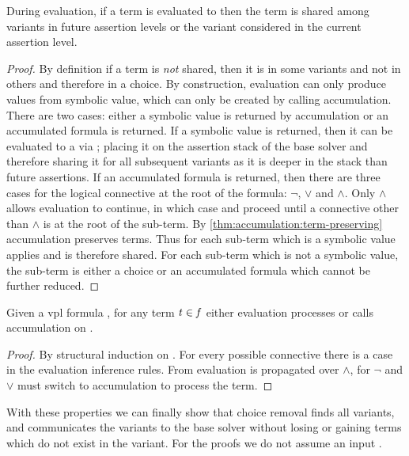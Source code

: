 \begin{theorem}
  \label{thm:evaluation:term-preserving}
  During evaluation, if a term is evaluated to \unit{} then the term is shared
  among variants in future assertion levels or the variant considered in the
  current assertion level.
\end{theorem}
%
\begin{proof}
  By definition if a term is \emph{not} shared, then it is in some variants and
  not in others and therefore in a choice. By construction, evaluation can only
  produce \unit{} values from symbolic value, which can only be created by
  calling accumulation. There are two cases: either a symbolic value is returned
  by accumulation or an accumulated formula is returned. If a symbolic value is
  returned, then it can be evaluated to a \unit{} via \evSym{}; placing it on
  the assertion stack of the base solver and therefore sharing it for all
  subsequent variants as it is deeper in the stack than future assertions. If an
  accumulated formula is returned, then there are three cases for the logical
  connective at the root of the formula: $\neg$, $\vee$ and $\wedge$. Only
  $\wedge$ allows evaluation to continue, in which case \evSym{} and \evAnd{}
  proceed until a connective other than $\wedge$ is at the root of the sub-term.
  By \autoref{thm:accumulation:term-preserving} accumulation preserves terms.
  Thus for each sub-term which is a symbolic value \evSym{} applies and is
  therefore shared. For each sub-term which is not a symbolic value, the
  sub-term is either a choice or an accumulated formula which cannot be further
  reduced.
\end{proof}

\begin{lemma}
  \label{lemma:ev:all-terms}
  Given a \ac{vpl} formula \fV{}, for any term $\mathit{t}{} \in \mathit{f}{}$ either
  evaluation processes \tV{} or calls accumulation on \tV{}.
\end{lemma}
%
\begin{proof}
  By structural induction on \tV{}. For every possible connective there is a
  case in the evaluation inference rules. From \evAnd{} evaluation is
  propagated over $\wedge$, for $\neg$ and $\vee$ must switch to accumulation to
  process the term.
\end{proof}

With these properties we can finally show that choice removal finds all
variants, and communicates the variants to the base solver without losing or
gaining terms which do not exist in the variant. For the proofs we do not assume
an input \vc{}.

